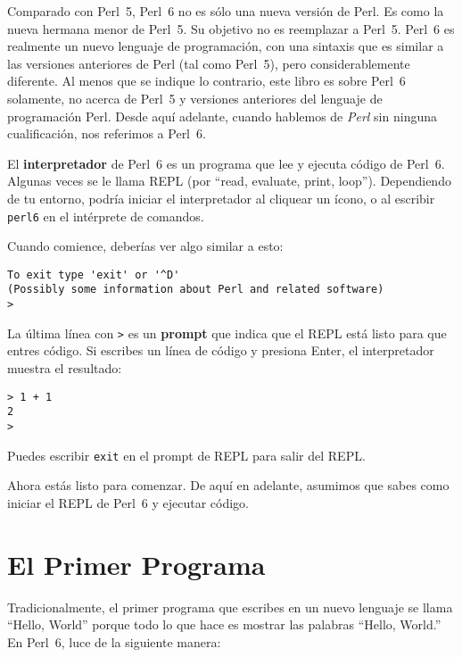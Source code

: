 Comparado con Perl~5, Perl~6 no es sólo una nueva versión de Perl.
Es como la nueva hermana menor de Perl~5. Su objetivo no es reemplazar
a Perl~5. Perl~6 es realmente un nuevo lenguaje de programación, con una sintaxis
que es similar a las versiones anteriores de Perl (tal como Perl~5), pero considerablemente
diferente. Al menos que se indique lo contrario, este libro es sobre Perl~6 solamente, no
acerca de Perl~5 y versiones anteriores del lenguaje de programación Perl. Desde aquí adelante,
cuando hablemos de \emph{Perl} sin ninguna cualificación, nos referimos a Perl~6.


El {\bf interpretador} de Perl~6 es un programa que lee y  
ejecuta código de Perl~6. Algunas veces se le llama REPL (por ``read, 
evaluate, print, loop''). Dependiendo de tu entorno, 
podría iniciar el interpretador al cliquear un ícono, o al 
escribir {\tt perl6} en el intérprete de comandos.

Cuando comience, deberías ver algo similar a esto:

\begin{verbatim}
To exit type 'exit' or '^D'
(Possibly some information about Perl and related software)
> 
\end{verbatim}
%

La última línea con {\tt >} es un {\bf prompt} que indica 
que el REPL está listo para que entres código. Si escribes un 
línea de código y presiona Enter, el interpretador muestra el resultado: 

\begin{lstlisting}
> 1 + 1
2
>
\end{lstlisting}
%
Puedes escribir {\tt exit} en el prompt de REPL para salir del REPL.

Ahora estás listo para comenzar.
De aquí en adelante, asumimos que sabes como iniciar el REPL de Perl~6 y 
ejecutar código.


\section{El Primer Programa}
\label{hello}

Tradicionalmente, el primer programa que escribes en un nuevo lenguaje
se llama ``Hello, World'' porque todo lo que hace es mostrar las palabras
``Hello, World.''  En Perl~6, luce de la siguiente manera:

